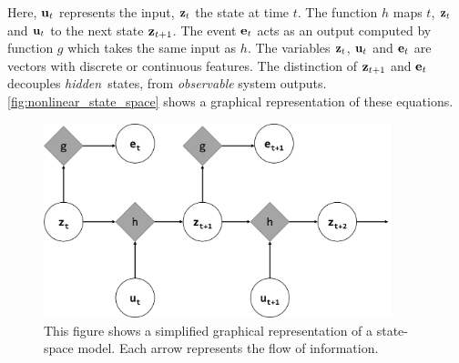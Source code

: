 \documentclass[./../../paper.tex]{subfiles}
\begin{document}
\noindent Here, $\mathbf{u}_t$ represents the input, $\mathbf{z}_t$ the state at time $t$. The function $h$ maps $t$, $\mathbf{z}_t$ and $\mathbf{u}_t$ to the next state $\mathbf{z}_{t+1}$. The event $\mathbf{e}_t$ acts as an output computed by function $g$ which takes the same input as $h$. The variables $\mathbf{z}_t$, $\mathbf{u}_t$ and $\mathbf{e}_t$ are vectors with discrete or continuous features. The distinction of $\mathbf{z}_{t+1}$ and $\mathbf{e}_t$ decouples \emph{hidden}\footnotemark~states, from \emph{observable} system outputs.
\autoref{fig:nonlinear_state_space} shows a graphical representation of these equations.

\begin{figure}[htb]
    \centering
    \includegraphics[width=0.9\textwidth]{figures/Graphics/Slide5.PNG}
    \caption{This figure shows a simplified graphical representation of a state-space model. Each arrow represents the flow of information.}
    \label{fig:nonlinear_state_space}
\end{figure}

\end{document}
